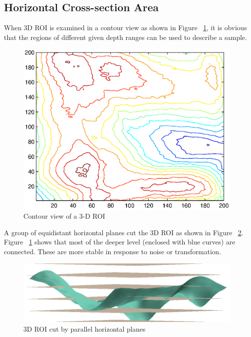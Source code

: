 \subsection{Horizontal Cross-section Area}
\label{ssec:methodology:hca}

When 3D ROI is examined in a contour view as shown in Figure ~\ref{fig:methodology:roicontour}, it is obvious that the regions of different given depth ranges can be used to describe a sample.

\begin{figure}[htb]
  \begin{center}
    \includegraphics[width=0.9\linewidth]{ch-methodology/figures/roicontour}
    \caption[Contour view of a 3-D ROI]{Contour view of a 3-D ROI}
    \label{fig:methodology:roicontour}
  \end{center}
\end{figure}

A group of equidistant horizontal planes cut the 3D ROI as shown in Figure ~\ref{fig:methodology:planecut}. Figure ~\ref{fig:methodology:roicontour} shows that most of the deeper level (enclosed with blue curves) are connected. These are more stable in response to noise or transformation.

\begin{figure}[htb]
  \begin{center}
    \includegraphics[width=0.9\linewidth]{ch-methodology/figures/planecut}
    \caption[3D ROI cut by parallel horizontal planes]{3D ROI cut by parallel horizontal planes}
    \label{fig:methodology:planecut}
  \end{center}
\end{figure}


